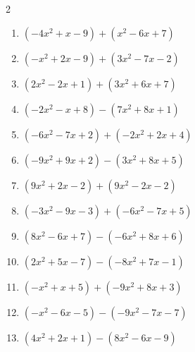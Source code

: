 \begin{multicols}{2}
\begin{enumerate}
  \item $(-4x^{2}+x-9)+(x^{2}-6x+7)$


  \item $(-x^{2}+2x-9)+(3x^{2}-7x-2)$


  \item $(2x^{2}-2x+1)+(3x^{2}+6x+7)$


  \item $(-2x^{2}-x+8)-(7x^{2}+8x+1)$


  \item $(-6x^{2}-7x+2)+(-2x^{2}+2x+4)$


  \item $(-9x^{2}+9x+2)-(3x^{2}+8x+5)$


\columnbreak %

\resetques

  \item $(9x^{2}+2x-2)+(9x^{2}-2x-2)$


  \item $(-3x^{2}-9x-3)+(-6x^{2}-7x+5)$


  \item $(8x^{2}-6x+7)-(-6x^{2}+8x+6)$


  \item $(2x^{2}+5x-7)-(-8x^{2}+7x-1)$


  \item $(-x^{2}+x+5)+(-9x^{2}+8x+3)$


  \item $(-x^{2}-6x-5)-(-9x^{2}-7x-7)$


  \item $(4x^{2}+2x+1)-(8x^{2}-6x-9)$



\end{enumerate}
\end{multicols}
